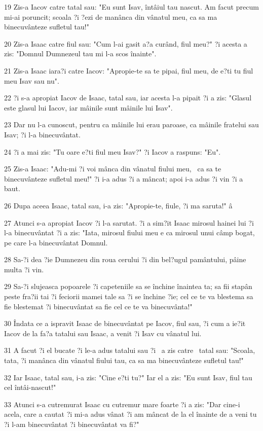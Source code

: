 \par 19 Zis-a Iacov catre tatal sau: "Eu sunt Isav, întâiul tau nascut. Am facut precum mi-ai poruncit; scoala ?i ?ezi de manânca din vânatul meu, ca sa ma binecuvânteze sufletul tau!"
\par 20 Zis-a Isaac catre fiul sau: "Cum l-ai gasit a?a curând, fiul meu?" ?i acesta a zis: "Domnul Dumnezeul tau mi l-a scos înainte".
\par 21 Zis-a Isaac iara?i catre Iacov: "Apropie-te sa te pipai, fiul meu, de e?ti tu fiul meu Isav sau nu".
\par 22 ?i s-a apropiat Iacov de Isaac, tatal sau, iar acesta l-a pipait ?i a zis: "Glasul este glasul lui Iacov, iar mâinile sunt mâinile lui Isav".
\par 23 Dar nu l-a cunoscut, pentru ca mâinile lui erau paroase, ca mâinile fratelui sau Isav; ?i l-a binecuvântat.
\par 24 ?i a mai zis: "Tu oare e?ti fiul meu Isav?" ?i Iacov a raspuns: "Eu".
\par 25 Zis-a Isaac: "Adu-mi ?i voi mânca din vânatul fiului meu,  ca sa te binecuvânteze sufletul meu!" ?i i-a adus ?i a mâncat; apoi i-a adus ?i vin ?i a baut.
\par 26 Dupa aceea Isaac, tatal sau, i-a zis: "Apropie-te, fiule, ?i ma saruta!" â
\par 27 Atunci s-a apropiat Iacov ?i l-a sarutat. ?i a sim?it Isaac mirosul hainei lui ?i l-a binecuvântat ?i a zis: "Iata, mirosul fiului meu e ca mirosul unui câmp bogat, pe care l-a binecuvântat Domnul.
\par 28 Sa-?i dea ?ie Dumnezeu din roua cerului ?i din bel?ugul pamântului, pâine multa ?i vin.
\par 29 Sa-?i slujeasca popoarele ?i capeteniile sa se închine înaintea ta; sa fii stapân peste fra?ii tai ?i feciorii mamei tale sa ?i se închine ?ie; cel ce te va blestema sa fie blestemat ?i binecuvântat sa fie cel ce te va binecuvânta!"
\par 30 Îndata ce a ispravit Isaac de binecuvântat pe Iacov, fiul sau, ?i cum a ie?it Iacov de la fa?a tatalui sau Isaac, a venit ?i Isav cu vânatul lui.
\par 31 A facut ?i el bucate ?i le-a adus tatalui sau ?i  a zis catre  tatal sau: "Scoala, tata, ?i manânca din vânatul fiului tau, ca sa ma binecuvânteze sufletul tau!"
\par 32 Iar Isaac, tatal sau, i-a zis: "Cine e?ti tu?" Iar el a zis: "Eu sunt Isav, fiul tau cel întâi-nascut!"
\par 33 Atunci s-a cutremurat Isaac cu cutremur mare foarte ?i a zis: "Dar cine-i acela, care a cautat ?i mi-a adus vânat ?i am mâncat de la el înainte de a veni tu ?i l-am binecuvântat ?i binecuvântat va fi?"
